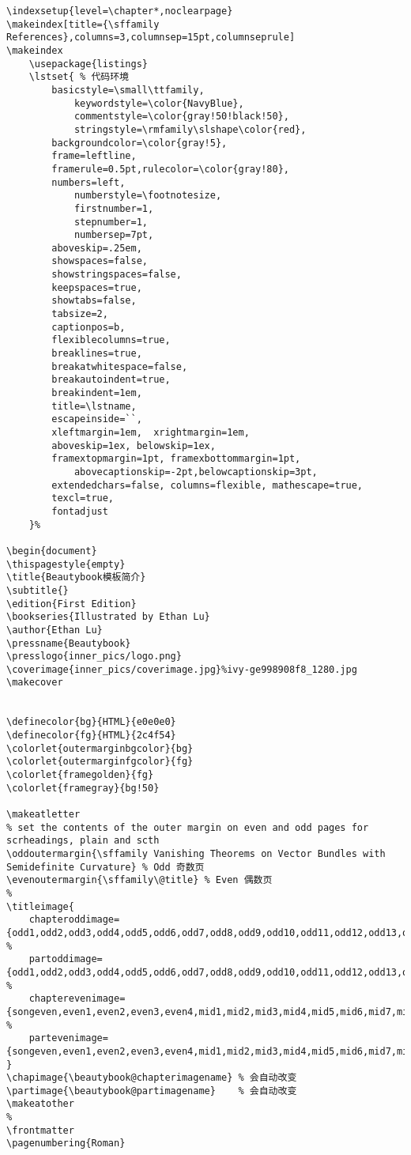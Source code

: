 \documentclass[lang=cn,zihao=-4,a4paper,fontset=windows]{beautybook}
\begin{document}
\begin{lstlisting}
\indexsetup{level=\chapter*,noclearpage}
\makeindex[title={\sffamily References},columns=3,columnsep=15pt,columnseprule]
\makeindex
    \usepackage{listings}
    \lstset{ % 代码环境
        basicstyle=\small\ttfamily,	
            keywordstyle=\color{NavyBlue}, 
            commentstyle=\color{gray!50!black!50},   	
            stringstyle=\rmfamily\slshape\color{red}, 	
        backgroundcolor=\color{gray!5},     
        frame=leftline,						
        framerule=0.5pt,rulecolor=\color{gray!80}, 
        numbers=left,				
            numberstyle=\footnotesize,	
            firstnumber=1,
            stepnumber=1,                  	
            numbersep=7pt,               	
        aboveskip=.25em, 			
        showspaces=false,               	
        showstringspaces=false,        
        keepspaces=true, 					
        showtabs=false,                 	
        tabsize=2,                     		
        captionpos=b,                   	
        flexiblecolumns=true, 			
        breaklines=true,                	
        breakatwhitespace=false,        	
        breakautoindent=true,			
        breakindent=1em, 			
        title=\lstname,				
        escapeinside=``,  		
        xleftmargin=1em,  xrightmargin=1em,     
        aboveskip=1ex, belowskip=1ex,
        framextopmargin=1pt, framexbottommargin=1pt,
            abovecaptionskip=-2pt,belowcaptionskip=3pt,
        extendedchars=false, columns=flexible, mathescape=true,
        texcl=true,
        fontadjust
    }%

\begin{document}
\thispagestyle{empty}
\title{Beautybook模板简介}
\subtitle{}
\edition{First Edition}
\bookseries{Illustrated by Ethan Lu}
\author{Ethan Lu}
\pressname{Beautybook}
\presslogo{inner_pics/logo.png}
\coverimage{inner_pics/coverimage.jpg}%ivy-ge998908f8_1280.jpg
\makecover


\definecolor{bg}{HTML}{e0e0e0}
\definecolor{fg}{HTML}{2c4f54}
\colorlet{outermarginbgcolor}{bg}
\colorlet{outermarginfgcolor}{fg}
\colorlet{framegolden}{fg}
\colorlet{framegray}{bg!50}

\makeatletter
% set the contents of the outer margin on even and odd pages for scrheadings, plain and scth
\oddoutermargin{\sffamily Vanishing Theorems on Vector Bundles with Semidefinite Curvature} % Odd 奇数页
\evenoutermargin{\sffamily\@title} % Even 偶数页
%
\titleimage{
    chapteroddimage={odd1,odd2,odd3,odd4,odd5,odd6,odd7,odd8,odd9,odd10,odd11,odd12,odd13,odd14,odd15,mid1,mid2,mid3,mid4,mid5,mid6,mid7,mid8,mid9,mid10,mid11},
%
    partoddimage={odd1,odd2,odd3,odd4,odd5,odd6,odd7,odd8,odd9,odd10,odd11,odd12,odd13,odd14,odd15,mid1,mid2,mid3,mid4,mid5,mid6,mid7,mid8,mid9,mid10,mid11},
%
    chapterevenimage={songeven,even1,even2,even3,even4,mid1,mid2,mid3,mid4,mid5,mid6,mid7,mid8,mid9,mid10,mid11},
%
    partevenimage={songeven,even1,even2,even3,even4,mid1,mid2,mid3,mid4,mid5,mid6,mid7,mid8,mid9,mid10,mid11},
}
\chapimage{\beautybook@chapterimagename} % 会自动改变
\partimage{\beautybook@partimagename}    % 会自动改变
\makeatother
%
\frontmatter
\pagenumbering{Roman}


\end{lstlisting}
\end{document}
